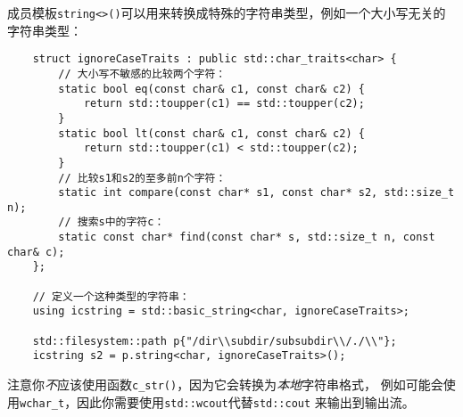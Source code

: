 成员模板\texttt{string<>()}可以用来转换成特殊的字符串类型，例如一个大小写无关的字符串类型：
\begin{lstlisting}
    struct ignoreCaseTraits : public std::char_traits<char> {
        // 大小写不敏感的比较两个字符：
        static bool eq(const char& c1, const char& c2) {
            return std::toupper(c1) == std::toupper(c2);
        }
        static bool lt(const char& c1, const char& c2) {
            return std::toupper(c1) < std::toupper(c2);
        }
        // 比较s1和s2的至多前n个字符：
        static int compare(const char* s1, const char* s2, std::size_t n);
        // 搜索s中的字符c：
        static const char* find(const char* s, std::size_t n, const char& c);
    };

    // 定义一个这种类型的字符串：
    using icstring = std::basic_string<char, ignoreCaseTraits>;

    std::filesystem::path p{"/dir\\subdir/subsubdir\\/./\\"};
    icstring s2 = p.string<char, ignoreCaseTraits>();
\end{lstlisting}
注意你\emph{不}应该使用函数\texttt{c\_str()}，因为它会转换为\emph{本地}字符串格式，
例如可能会使用\texttt{wchar\_t}，因此你需要使用\texttt{std::wcout}代替\texttt{std::cout}
来输出到输出流。

